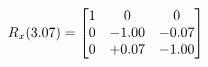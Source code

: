 \documentclass[preview]{standalone}
\begin{document}
\begin{align*}
\special{dvisvgm:raw <g id='unique000'>}R_{x}(3.07) = \begin{bmatrix}1 & 0 & 0 \\0 & -1.00 & -0.07 \\0 & +0.07 & -1.00\end{bmatrix}\special{dvisvgm:raw </g>}
\end{align*}
\end{document}
